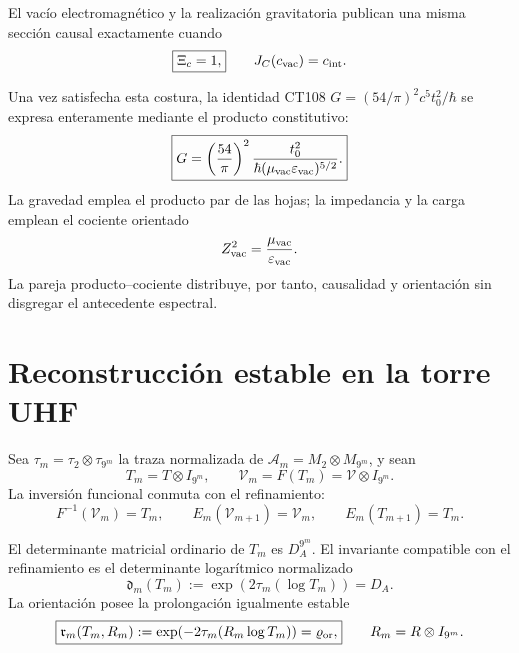 \begin{criterion}
\label{rm:crit:curve-causal-seam}
El vac\'io electromagn\'etico y la realizaci\'on gravitatoria publican una
misma secci\'on causal exactamente cuando
\begin{equation}
 \boxed{\Xi_c=1,}
 \qquad
 J_C(c_{\rm vac})=c_{\rm int}.
 \label{rm:eq:curve-Xi-one}
\end{equation}
\end{criterion}

Una vez satisfecha esta costura, la identidad CT108
\(
G=(54/\pi)^2c^5t_0^2/\hbar
\)
se expresa enteramente mediante el producto constitutivo:
\begin{equation}
 \boxed{
 G=\left(\frac{54}{\pi}\right)^2
 \frac{t_0^2}
 {\hbar(\mu_{\rm vac}\varepsilon_{\rm vac})^{5/2}}.}
 \label{rm:eq:curve-G-from-vacuum}
\end{equation}
La gravedad emplea el producto par de las hojas; la impedancia y la carga
emplean el cociente orientado
\begin{equation}
 Z_{\rm vac}^2=\frac{\mu_{\rm vac}}{\varepsilon_{\rm vac}}.
 \label{rm:eq:curve-Z-oriented}
\end{equation}
La pareja producto--cociente distribuye, por tanto, causalidad y orientaci\'on
sin disgregar el antecedente espectral.

\section{Reconstrucci\'on estable en la torre UHF}

Sea \(\tau_m=\tau_2\otimes\tau_{9^m}\) la traza normalizada de
\(\mathcal A_m=M_2\otimes M_{9^m}\), y sean
\begin{equation}
 T_m=T\otimes I_{9^m},
 \qquad
 \mathcal V_m=F(T_m)=\mathcal V\otimes I_{9^m}.
 \label{rm:eq:curve-UHF-TV}
\end{equation}
La inversi\'on funcional conmuta con el refinamiento:
\begin{equation}
 F^{-1}(\mathcal V_m)=T_m,
 \qquad
 E_m(\mathcal V_{m+1})=\mathcal V_m,
 \qquad
 E_m(T_{m+1})=T_m.
 \label{rm:eq:curve-UHF-inversion}
\end{equation}

El determinante matricial ordinario de \(T_m\) es \(D_A^{9^m}\). El
invariante compatible con el refinamiento es el determinante logar\'itmico
normalizado
\begin{equation}
 \boxed{
 \mathfrak d_m(T_m)
 :=\exp\!\left(2\tau_m(\log T_m)\right)=D_A.}
 \label{rm:eq:curve-normalized-determinant}
\end{equation}
La orientaci\'on posee la prolongaci\'on igualmente estable
\begin{equation}
 \boxed{
 \mathfrak r_m(T_m,R_m)
 :=\exp\!\left(-2\tau_m(R_m\log T_m)\right)
 =\varrho_{\rm or},}
 \qquad
 R_m=R\otimes I_{9^m}.
 \label{rm:eq:curve-normalized-orientation}
\end{equation}

